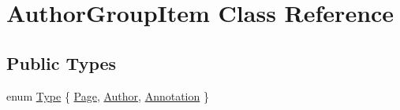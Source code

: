 \hypertarget{classAuthorGroupItem}{\section{Author\+Group\+Item Class Reference}
\label{classAuthorGroupItem}
}
\subsection*{Public Types}
\begin{DoxyCompactItemize}
\item 
enum \hyperlink{classAuthorGroupItem_a81146eef0470ace44a96271cdc1172d5}{Type} \{ \hyperlink{classAuthorGroupItem_a81146eef0470ace44a96271cdc1172d5ad8f8f4cff087cf79bc755aa05f6d4a4c}{Page}, 
\hyperlink{classAuthorGroupItem_a81146eef0470ace44a96271cdc1172d5ab42e2768537a393def6f11fed872efce}{Author}, 
\hyperlink{classAuthorGroupItem_a81146eef0470ace44a96271cdc1172d5a8e28191a7ca3a690f52f0c6bee8062f6}{Annotation}
 \}
\end{DoxyCompactItemize}
